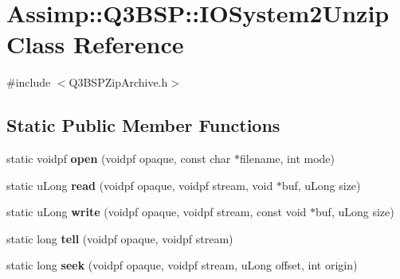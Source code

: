 \hypertarget{class_assimp_1_1_q3_b_s_p_1_1_i_o_system2_unzip}{\section{Assimp\+:\+:Q3\+B\+S\+P\+:\+:I\+O\+System2\+Unzip Class Reference}
\label{class_assimp_1_1_q3_b_s_p_1_1_i_o_system2_unzip}
}


{\ttfamily \#include $<$Q3\+B\+S\+P\+Zip\+Archive.\+h$>$}

\subsection*{Static Public Member Functions}
\begin{DoxyCompactItemize}
\item 
\hypertarget{class_assimp_1_1_q3_b_s_p_1_1_i_o_system2_unzip_ad3fddbc471b084348ca6c9b3abc4f891}{static voidpf {\bfseries open} (voidpf opaque, const char $\ast$filename, int mode)}\label{class_assimp_1_1_q3_b_s_p_1_1_i_o_system2_unzip_ad3fddbc471b084348ca6c9b3abc4f891}

\item 
\hypertarget{class_assimp_1_1_q3_b_s_p_1_1_i_o_system2_unzip_a65d37c1ea22d47751ec8fafc48d9dcbc}{static u\+Long {\bfseries read} (voidpf opaque, voidpf stream, void $\ast$buf, u\+Long size)}\label{class_assimp_1_1_q3_b_s_p_1_1_i_o_system2_unzip_a65d37c1ea22d47751ec8fafc48d9dcbc}

\item 
\hypertarget{class_assimp_1_1_q3_b_s_p_1_1_i_o_system2_unzip_a9c44cd4c8b52d11155ebac69c3d68d56}{static u\+Long {\bfseries write} (voidpf opaque, voidpf stream, const void $\ast$buf, u\+Long size)}\label{class_assimp_1_1_q3_b_s_p_1_1_i_o_system2_unzip_a9c44cd4c8b52d11155ebac69c3d68d56}

\item 
\hypertarget{class_assimp_1_1_q3_b_s_p_1_1_i_o_system2_unzip_a1e213a6b7170a9ae8a7fa91e595ada20}{static long {\bfseries tell} (voidpf opaque, voidpf stream)}\label{class_assimp_1_1_q3_b_s_p_1_1_i_o_system2_unzip_a1e213a6b7170a9ae8a7fa91e595ada20}

\item 
\hypertarget{class_assimp_1_1_q3_b_s_p_1_1_i_o_system2_unzip_a51ad17e17b27d388b0cc56f508500d3d}{static long {\bfseries seek} (voidpf opaque, voidpf stream, u\+Long offset, int origin)}\label{class_assimp_1_1_q3_b_s_p_1_1_i_o_system2_unzip_a51ad17e17b27d388b0cc56f508500d3d}


\end{DoxyCompactItemize}
